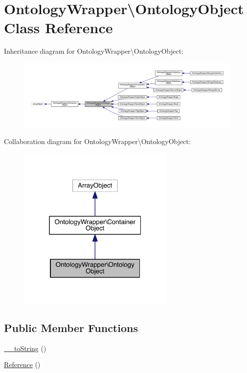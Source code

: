 \hypertarget{class_ontology_wrapper_1_1_ontology_object}{\section{Ontology\-Wrapper\textbackslash{}Ontology\-Object Class Reference}
\label{class_ontology_wrapper_1_1_ontology_object}
}


Inheritance diagram for Ontology\-Wrapper\textbackslash{}Ontology\-Object\-:\nopagebreak
\begin{figure}[H]
\begin{center}
\leavevmode
\includegraphics[width=350pt]{class_ontology_wrapper_1_1_ontology_object__inherit__graph}
\end{center}
\end{figure}


Collaboration diagram for Ontology\-Wrapper\textbackslash{}Ontology\-Object\-:\nopagebreak
\begin{figure}[H]
\begin{center}
\leavevmode
\includegraphics[width=220pt]{class_ontology_wrapper_1_1_ontology_object__coll__graph}
\end{center}
\end{figure}
\subsection*{Public Member Functions}
\begin{DoxyCompactItemize}
\item 
\hyperlink{class_ontology_wrapper_1_1_ontology_object_aa3f8d87842ea2c3a50b3e760adb2224f}{\-\_\-\-\_\-to\-String} ()
\item 
\hyperlink{class_ontology_wrapper_1_1_ontology_object_a28e1502b1cc43e05c07d854e79780e9c}{Reference} ()
\end{DoxyCompactItemize}
